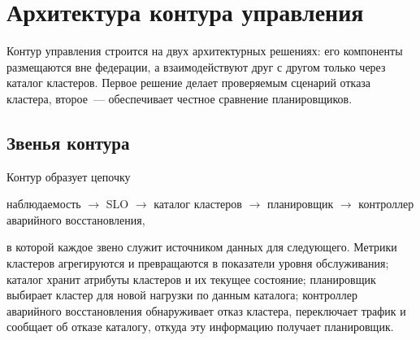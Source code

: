 \chapter{Архитектура контура управления}

Контур управления строится на двух архитектурных решениях: его компоненты
размещаются вне федерации, а взаимодействуют друг с другом только через
каталог кластеров. Первое решение делает проверяемым сценарий отказа
кластера, второе~--- обеспечивает честное сравнение планировщиков.

\section{Звенья контура}

Контур образует цепочку
\begin{center}
наблюдаемость $\to$ SLO $\to$ каталог кластеров $\to$ планировщик $\to$
контроллер аварийного восстановления,
\end{center}
в которой каждое звено служит источником данных для следующего. Метрики
кластеров агрегируются и превращаются в показатели уровня обслуживания;
каталог хранит атрибуты кластеров и их текущее состояние; планировщик
выбирает кластер для новой нагрузки по данным каталога; контроллер
аварийного восстановления обнаруживает отказ кластера, переключает трафик
и сообщает об отказе каталогу, откуда эту информацию получает
планировщик.

